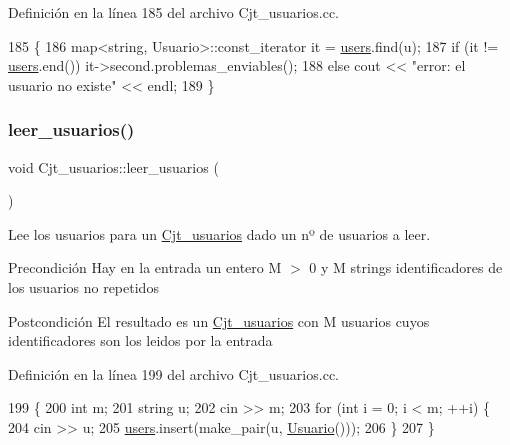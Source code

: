 Definición en la línea 185 del archivo Cjt\+\_\+usuarios.\+cc.


\begin{DoxyCode}
185                                                                   \{
186         map<string, Usuario>::const\_iterator it = \mbox{\hyperlink{class_cjt__usuarios_a0b702ca0184d6fb2674cc827d39d5bff}{users}}.find(u);
187         \textcolor{keywordflow}{if} (it != \mbox{\hyperlink{class_cjt__usuarios_a0b702ca0184d6fb2674cc827d39d5bff}{users}}.end()) it->second.problemas\_enviables();
188         \textcolor{keywordflow}{else} cout << \textcolor{stringliteral}{"error: el usuario no existe"} << endl;
189       \}
\end{DoxyCode}
\mbox{\label{class_cjt__usuarios_aeb27ae7d46e9b78e2d477df74461bc68}} 
\subsubsection{\texorpdfstring{leer\+\_\+usuarios()}{leer\_usuarios()}}
{\footnotesize\ttfamily void Cjt\+\_\+usuarios\+::leer\+\_\+usuarios (\begin{DoxyParamCaption}{ }\end{DoxyParamCaption})}



Lee los usuarios para un \mbox{\hyperlink{class_cjt__usuarios}{Cjt\+\_\+usuarios}} dado un nº de usuarios a leer. 

\begin{DoxyPrecond}{Precondición}
Hay en la entrada un entero M $>$ 0 y M strings identificadores de los usuarios no repetidos 
\end{DoxyPrecond}
\begin{DoxyPostcond}{Postcondición}
El resultado es un \mbox{\hyperlink{class_cjt__usuarios}{Cjt\+\_\+usuarios}} con M usuarios cuyos identificadores son los leidos por la entrada 
\end{DoxyPostcond}


Definición en la línea 199 del archivo Cjt\+\_\+usuarios.\+cc.


\begin{DoxyCode}
199                                        \{
200         \textcolor{keywordtype}{int} m;
201         \textcolor{keywordtype}{string} u;
202         cin >> m;
203         \textcolor{keywordflow}{for} (\textcolor{keywordtype}{int} i = 0; i < m; ++i) \{
204           cin >> u;
205           \mbox{\hyperlink{class_cjt__usuarios_a0b702ca0184d6fb2674cc827d39d5bff}{users}}.insert(make\_pair(u, \mbox{\hyperlink{class_usuario}{Usuario}}()));
206         \}
207       \}
\end{DoxyCode}
\mbox{\label{class_cjt__usuarios_abf4abc6a1349c504bd0628cfe665df39}} 

